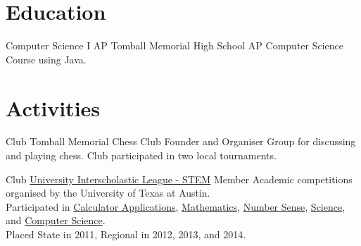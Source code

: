 \documentclass[10pt,letterpaper,sans]{moderncv}
\newcommand{\wlink}[2]{\textcolor[HTML]{0020B6}{\href{#1}{#2}}}
\begin{document}
\makecvtitle{}

\section{Education}
        {Computer Science I AP}
        {Tomball Memorial High School}
        {}{}
        {
        AP Computer Science Course using Java.}

\section{Activities}
        {Club}
        {Tomball Memorial Chess Club}
        {Founder and Organiser}{}{
Group for discussing and playing chess. Club participated in two local tournaments.
}

        {Club}
        {\wlink{http://www.uiltexas.org/academics/stem}{University Interscholastic League - STEM}}
        {Member}{}{
        Academic competitions organised by the University of Texas at Austin. \\ %
        Participated in %
        \wlink{http://www.uiltexas.org/academics/stem/calculator-applications}{Calculator Applications}, %
        \wlink{http://www.uiltexas.org/academics/stem/mathematics}{Mathematics}, %
        \wlink{http://www.uiltexas.org/academics/stem/number-sense}{Number Sense}, %
        \wlink{http://www.uiltexas.org/academics/stem/science}{Science}, and %
        \wlink{http://www.uiltexas.org/academics/stem/computer-science}{Computer Science}. \\ %
        Placed State in 2011, Regional in 2012, 2013, and 2014.
}
\end{document}
